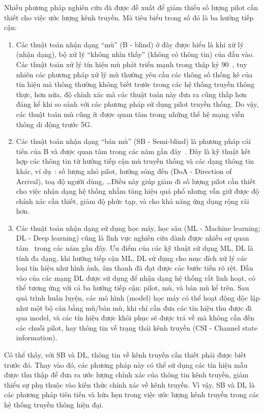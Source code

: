 Nhiều phương pháp nghiên cứu đã được đề xuất để giảm thiểu số lượng pilot cần thiết cho việc ước lượng kênh truyền. Mà tiêu biểu trong số đó là ba hướng tiếp cận: 
\begin{enumerate}
    \item Các thuật toán nhận dạng ``mù'' (B - blind) ở đây được hiểu là khi xử lý (nhận dạng), bộ xử lý ``không nhìn thấy'' (không có thông tin) của đầu vào. Các thuật toán xử lý tín hiệu mù phát triển mạnh trong thập kỷ 90~\cite{abed1997}, tuy nhiên các phương pháp xử lý mù thường yêu cầu các thông số thống kê của tín hiệu mà thông thường không biết trước trong các hệ thống truyền thông thực, hơn nữa, độ chính xác mà các thuật toán này đưa ra cũng thấp hơn đáng kể khi so sánh với các phương pháp sử dụng pilot truyền thống. Do vậy, các thuật toán mù cũng ít được quan tâm trong những thế hệ mạng viễn thông di động trước 5G.

    \item Các thuật toán nhận dạng ``bán mù'' (SB - Semi-blind) là phương pháp cải tiến của B và được quan tâm trong các năm gần đây~\cite{Ladaycia2017, Ladaycia2019, shaik2021}. Đây là kỹ thuật kết hợp các thông tin từ hướng tiếp cận mù truyền thống và các dạng thông tin khác, ví dụ~\cite{rekik}: số lượng nhỏ pilot, hướng sóng đến (DoA - Direction of Arrival), toạ độ người dùng, \ldots Điều này giúp giảm đi số lượng pilot cần thiết cho việc nhận dạng hệ thống nhằm tăng hiệu quả phổ nhưng vẫn giữ được độ chính xác cần thiết, giảm độ phức tạp, và cho khả năng ứng dụng rộng rãi hơn.

    \item Các thuật toán nhận dạng sử dụng học máy, học sâu (ML - Machine learning; DL - Deep learning) cũng là lĩnh vực nghiên cứu dành được nhiều sự quan tâm~\cite{Zhang2019} trong các năm gần đây. Ưu điểm của các kỹ thuật sử dụng ML, DL là tính đa dạng, khi hướng tiếp cận ML, DL sử dụng cho mục đích xử lý các loại tín hiệu như hình ảnh, âm thanh đã đạt được các bước tiến rõ rệt. Đầu vào của các mạng DL được sử dụng để nhận dạng hệ thống rất linh hoạt, có thể tương ứng với cả ba hướng tiếp cận: pilot, mù, và bán mù kể trên. Sau quá trình huấn luyện, các mô hình (model) học máy có thể hoạt động độc lập như một bộ cân bằng mù/bán mù, khi chỉ cần đưa các tín hiệu thu được đi qua model, và các tín hiệu được khôi phục sẽ được trả về mà không cần đến các chuỗi pilot, hay thông tin về trạng thái kênh truyền (CSI - Channel state information).
\end{enumerate}

Có thể thấy, với SB và DL, thông tin về kênh truyền cần thiết phải được biết trước đó. Thay vào đó, các phương pháp này có thể sử dụng các tín hiệu mẫu được thu thập để đưa ra ước lượng chính xác của thông tin kênh truyền, giảm thiểu sự phụ thuộc vào kiến thức chính xác về kênh truyền. Vì vậy, SB và DL là các phương pháp tiên tiến và hứa hẹn trong việc ước lượng kênh truyền trong các hệ thống truyền thông hiện đại.

